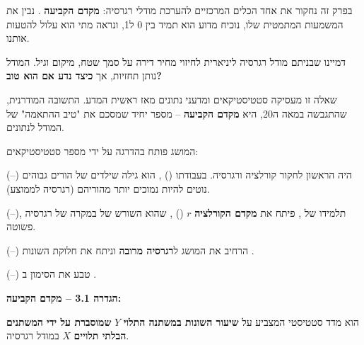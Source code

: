 

\noindent\textbf{}

\vspace{0.5cm}

בפרק זה נחקור את אחד הכלים המרכזיים להערכת מודלי רגרסיה: \textbf{מקדם הקביעה} . נבין את המשמעות המתמטית שלו, נוכיח מדוע הוא תמיד בין \num{0} ל\en{-}\num{1}, ונראה מתי הוא עלול להטעות אותנו.


דמיינו שבניתם מודל רגרסיה ליניארית לחיזוי מחיר דירה על סמך שטח, מיקום וגיל. המודל נותן תחזיות, אך \textbf{כיצד נדע אם הוא טוב?}

שאלה זו מעסיקה סטטיסטיקאים ומדעני נתונים מאז ראשית המדע. התשובה המודרנית, שהתגבשה במאה ה\en{-}\num{20}, היא \textbf{מקדם הקביעה} – מספר יחיד שמסכם את "טיב ההתאמה" של המודל לנתונים.


המושג פותח בהדרגה על ידי מספר סטטיסטיקאים:

\textbf{} (–) היה הראשון לחקור קורלציה ורגרסיה. בעבודתו  () \cite{galton1886}, הוא גילה שילדים של הורים גבוהים נוטים להיות נמוכים יותר מהוריהם (רגרסיה לממוצע).

\textbf{} (–), תלמידו של , פיתח את \textbf{מקדם הקורלציה} $r$ () \cite{pearson1896}, שהוא השורש של \Rsquared{} במקרה של רגרסיה פשוטה.

\textbf{} (–) הרחיב את המושג ל\textbf{רגרסיה מרובה}  וניתח את חלוקת השונות \cite{fisher1925}.

\textbf{} (–) טבע את הסימון \Rsquared{} ב\en{-} \cite{wright1921}.


\textbf{הגדרה \num{3.1} – מקדם הקביעה:}

\Rsquared{} הוא מדד סטטיסטי המצביע על \textbf{שיעור השונות במשתנה התלוי} $Y$ \textbf{שמוסברת על ידי המשתנים הבלתי תלויים} $X$ במודל רגרסיה.

